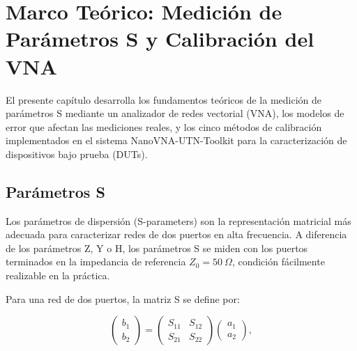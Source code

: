 
\section{Marco Teórico: Medición de Parámetros S y Calibración del VNA}

El presente capítulo desarrolla los fundamentos teóricos de la medición de
parámetros S mediante un analizador de redes vectorial (VNA), los modelos de
error que afectan las mediciones reales, y los cinco métodos de calibración
implementados en el sistema NanoVNA-UTN-Toolkit para la caracterización de
dispositivos bajo prueba (DUTs).

\newpage
\Encabezado

\subsection{Parámetros S}
\label{sec:sparams}

Los parámetros de dispersión (S-parameters) son la representación matricial
más adecuada para caracterizar redes de dos puertos en alta frecuencia. A
diferencia de los parámetros Z, Y o H, los parámetros S se miden con los
puertos terminados en la impedancia de referencia $Z_0 = 50~\Omega$, condición
fácilmente realizable en la práctica.

Para una red de dos puertos, la matriz S se define por:

\begin{equation}
    \begin{pmatrix} b_1 \\ b_2 \end{pmatrix}
    =
    \begin{pmatrix} S_{11} & S_{12} \\ S_{21} & S_{22} \end{pmatrix}
    \begin{pmatrix} a_1 \\ a_2 \end{pmatrix},
    \label{eq:matriz_s}
\end{equation}

